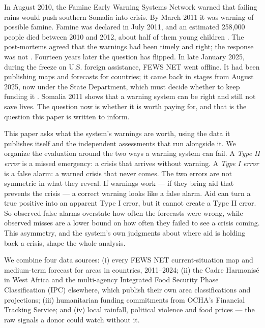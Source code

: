 \documentclass[11pt]{article}
\begin{document}
In August 2010, the Famine Early Warning Systems Network warned that failing rains would push southern Somalia into crisis. By March 2011 it was warning of possible famine. Famine was declared in July 2011, and an estimated 258,000 people died between 2010 and 2012, about half of them young children \citep{salama2012,checchi2013}. The post-mortems agreed that the warnings had been timely and right; the response was not \citep{hillbruner2012}. Fourteen years later the question has flipped. In late January 2025, during the freeze on U.S. foreign assistance, FEWS NET went offline. It had been publishing maps and forecasts for \outBefore{} countries; it came back in stages from August 2025, now under the State Department, which must decide whether to keep funding it \citep{Devex2025FEWS,NPR2026FEWS}. Somalia 2011 shows that a warning system can be right and still not save lives. The question now is whether it is worth paying for, and that is the question this paper is written to inform.

This paper asks what the system's warnings are worth, using the data it publishes itself and the independent assessments that run alongside it. We organize the evaluation around the two ways a warning system can fail. A \emph{Type II error} is a missed emergency: a crisis that arrives without warning. A \emph{Type I error} is a false alarm: a warned crisis that never comes. The two errors are not symmetric in what they reveal. If warnings work --- if they bring aid that prevents the crisis --- a correct warning looks like a false alarm. Aid can turn a true positive into an apparent Type I error, but it cannot create a Type II error. So observed false alarms overstate how often the forecasts were wrong, while observed misses are a lower bound on how often they failed to see a crisis coming. This asymmetry, and the system's own judgments about where aid is holding back a crisis, shape the whole analysis.

We combine four data sources: (i) every FEWS NET current-situation map and medium-term forecast for \csAreas{} areas in \csCountries{} countries, 2011--2024; (ii) the Cadre Harmonis\'e in West Africa and the multi-agency Integrated Food Security Phase Classification (IPC) elsewhere, which publish their own area classifications and projections; (iii) humanitarian funding commitments from OCHA's Financial Tracking Service; and (iv) local rainfall, political violence and food prices --- the raw signals a donor could watch without it.
\end{document}
